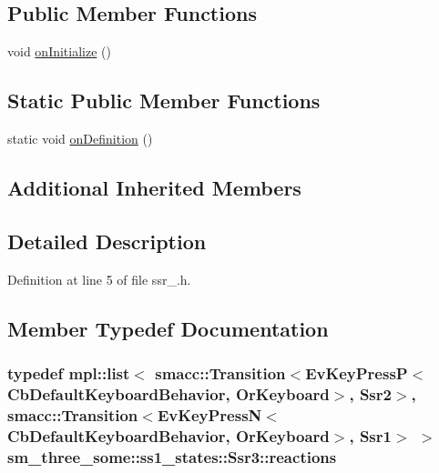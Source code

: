 \subsection*{Public Member Functions}
\begin{DoxyCompactItemize}
\item 
void \hyperlink{structsm__three__some_1_1ss1__states_1_1Ssr3_ae3c6976c1e36c083767400e7694d8aa0}{on\+Initialize} ()
\end{DoxyCompactItemize}
\subsection*{Static Public Member Functions}
\begin{DoxyCompactItemize}
\item 
static void \hyperlink{structsm__three__some_1_1ss1__states_1_1Ssr3_a8c1fc4142d98afbf1849a15795f39976}{on\+Definition} ()
\end{DoxyCompactItemize}
\subsection*{Additional Inherited Members}


\subsection{Detailed Description}


Definition at line 5 of file ssr\+\_.\+h.



\subsection{Member Typedef Documentation}
\subsubsection[{\texorpdfstring{reactions}{reactions}}]{\setlength{\rightskip}{0pt plus 5cm}typedef mpl\+::list$<$ {\bf smacc\+::\+Transition}$<$Ev\+Key\+PressP$<$Cb\+Default\+Keyboard\+Behavior, {\bf Or\+Keyboard}$>$, {\bf Ssr2}$>$, {\bf smacc\+::\+Transition}$<$Ev\+Key\+PressN$<$Cb\+Default\+Keyboard\+Behavior, {\bf Or\+Keyboard}$>$, {\bf Ssr1}$>$ $>$ {\bf sm\+\_\+three\+\_\+some\+::ss1\+\_\+states\+::\+Ssr3\+::reactions}}\hypertarget{structsm__three__some_1_1ss1__states_1_1Ssr3_a6189593dbf24f22a5a1b70aef804660e}{}\label{structsm__three__some_1_1ss1__states_1_1Ssr3_a6189593dbf24f22a5a1b70aef804660e}


